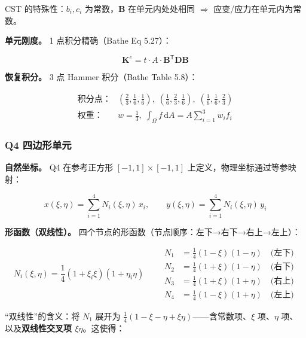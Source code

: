 \documentclass[12pt,a4paper]{ctexart}
\begin{document}
CST 的特殊性：$b_i,c_i$ 为常数，$\mathbf{B}$ 在单元内处处相同 $\Rightarrow$ 应变/应力在单元内为常数。

\textbf{单元刚度。} 1 点积分精确（Bathe Eq 5.27）：

\begin{equation}\label{eq:cst-K}
\mathbf{K}^e = t\cdot A\cdot \mathbf{B}^{\mathsf T}\mathbf{D}\mathbf{B}
\end{equation}

\textbf{恢复积分。} 3 点 Hammer 积分（Bathe Table 5.8）：

\begin{equation}\label{eq:cst-hammer}
\begin{aligned}
\text{积分点：}&(\tfrac{2}{3},\tfrac{1}{6},\tfrac{1}{6}),\;
(\tfrac{1}{6},\tfrac{2}{3},\tfrac{1}{6}),\;
(\tfrac{1}{6},\tfrac{1}{6},\tfrac{2}{3}) \\
\text{权重：}&w = \tfrac{1}{3},\; \int_\Omega f\,\mathrm{d}A = A\sum_{i=1}^3 w_i f_i
\end{aligned}
\end{equation}

\subsubsection{Q4 四边形单元}

\textbf{自然坐标。} Q4 在参考正方形 $[-1,1]\times[-1,1]$ 上定义，物理坐标通过等参映射：

\begin{equation}\label{eq:q4-isoparam}
x(\xi,\eta) = \sum_{i=1}^4 N_i(\xi,\eta)\, x_i,\qquad
y(\xi,\eta) = \sum_{i=1}^4 N_i(\xi,\eta)\, y_i
\end{equation}

\textbf{形函数（双线性）。} 四个节点的形函数（节点顺序：左下→右下→右上→左上）：

\begin{equation}\label{eq:q4-N}
\boxed{
N_i(\xi,\eta) = \frac{1}{4}(1+\xi_i\xi)(1+\eta_i\eta)
}
\qquad
\begin{aligned}
N_1 &= \tfrac{1}{4}(1-\xi)(1-\eta) \quad\text{(左下)} \\
N_2 &= \tfrac{1}{4}(1+\xi)(1-\eta) \quad\text{(右下)} \\
N_3 &= \tfrac{1}{4}(1+\xi)(1+\eta) \quad\text{(右上)} \\
N_4 &= \tfrac{1}{4}(1-\xi)(1+\eta) \quad\text{(左上)}
\end{aligned}
\end{equation}

“双线性”的含义：将 $N_1$ 展开为 $\frac{1}{4}(1-\xi-\eta+\xi\eta)$——含常数项、$\xi$ 项、$\eta$ 项、以及\textbf{双线性交叉项 $\xi\eta$}。这使得：
\end{document}
